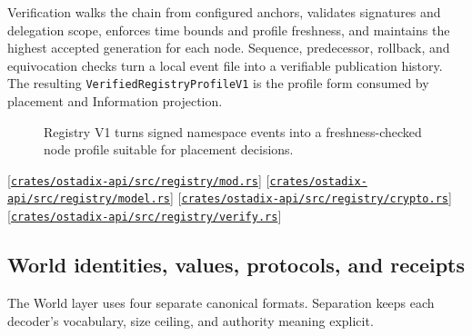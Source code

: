 \documentclass[11pt,oneside]{article}
\newcommand{\src}[1]{\textcolor{OSlate}{\scriptsize[\href{https://github.com/lostadi/OSTADIX/blob/c0b02c326b2329a95ba52447c7180bc93957cd57/#1}{\nolinkurl{#1}}]}\allowbreak}
\begin{document}
Verification walks the chain from configured anchors, validates signatures and
delegation scope, enforces time bounds and profile freshness, and maintains the
highest accepted generation for each node. Sequence, predecessor, rollback,
and equivocation checks turn a local event file into a verifiable publication
history. The resulting \texttt{VerifiedRegistryProfileV1} is the profile form
consumed by placement and Information projection.

\begin{figure}[htbp]
\centering
{}
\caption{Registry V1 turns signed namespace events into a freshness-checked
node profile suitable for placement decisions.}
\label{fig:registry}
\end{figure}

\src{crates/ostadix-api/src/registry/mod.rs}
\src{crates/ostadix-api/src/registry/model.rs}
\src{crates/ostadix-api/src/registry/crypto.rs}
\src{crates/ostadix-api/src/registry/verify.rs}

\subsection{World identities, values, protocols, and receipts}
\label{sec:world-codecs}

The World layer uses four separate canonical formats. Separation keeps each
decoder's vocabulary, size ceiling, and authority meaning explicit.
\end{document}
